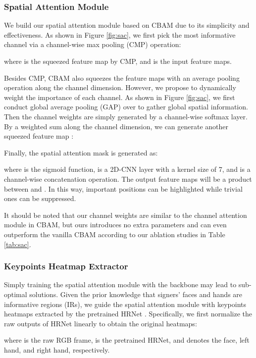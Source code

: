 \documentclass[acmsmall,screen]{acmart}
\begin{document}
\subsubsection{Spatial Attention Module}
We build our spatial attention module based on CBAM \cite{woo2018cbam} due to its simplicity and effectiveness.
As shown in Figure \ref{fig:sac}, we first pick the most informative channel via a channel-wise max pooling (CMP) operation:

where  is the squeezed feature map by CMP, and  is the input feature maps.

Besides CMP, CBAM also squeezes the feature maps with an average pooling operation along the channel dimension. 
However, we propose to dynamically weight the importance of each channel.
As shown in Figure \ref{fig:sac}, we first conduct global average pooling (GAP) over  to gather global spatial information. 
Then the channel weights  are simply generated by a channel-wise softmax layer.
By a weighted sum along the channel dimension, we can generate another squeezed feature map :

Finally, the spatial attention mask  is generated as:

where  is the sigmoid function,  is a 2D-CNN layer with a kernel size of 7, and  is a channel-wise concatenation operation. 
The output feature maps will be a product between  and .
In this way, important positions can be highlighted while trivial ones can be suppressed.

It should be noted that our channel weights are similar to the channel attention module in CBAM, but ours introduces no extra parameters and can even outperform the vanilla CBAM according to our ablation studies in Table \ref{tab:sac}.

\subsubsection{Keypoints Heatmap Extractor}
Simply training the spatial attention module with the backbone may lead to sub-optimal solutions.
Given the prior knowledge that signers' faces and hands are informative regions (IRs), we guide the spatial attention module with keypoints heatmaps extracted by the pretrained HRNet \cite{sun2019deep, andriluka20142d}.
Specifically, we first normalize the raw outputs of HRNet linearly to obtain the original heatmaps:

where  is the raw RGB frame,  is the pretrained HRNet, and  denotes the face, left hand, and right hand, respectively.
\end{document}
